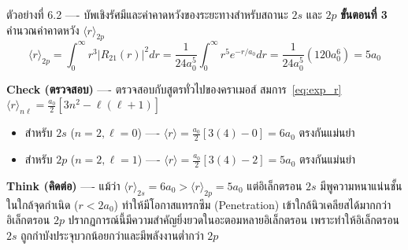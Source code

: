 \begin{psctbox}{ตัวอย่างที่ 6.2 ---- บัพเชิงรัศมีและค่าคาดหวังของระยะทางสำหรับสถานะ $2s$ และ $2p$}
\textbf{ขั้นตอนที่ 3} คำนวณค่าคาดหวัง $\langle r \rangle_{2p}$
\begin{equation*}
\langle r \rangle_{2p} = \int_0^\infty r^3 |R_{21}(r)|^2 dr = \frac{1}{24 a_0^5} \int_0^\infty r^5 e^{-r/a_0} dr = \frac{1}{24 a_0^5} (120 a_0^6) = 5 a_0
\end{equation*}

\textbf{Check (ตรวจสอบ)} ---- ตรวจสอบกับสูตรทั่วไปของคราเมอส์ สมการ~\eqref{eq:exp_r} $\langle r \rangle_{n\ell} = \frac{a_0}{2}[3n^2 - \ell(\ell+1)]$
\begin{itemize}
    \item สำหรับ $2s$ ($n=2, \ell=0$) ---- $\langle r \rangle = \frac{a_0}{2}[3(4) - 0] = 6 a_0$ ตรงกันแม่นยำ
    \item สำหรับ $2p$ ($n=2, \ell=1$) ---- $\langle r \rangle = \frac{a_0}{2}[3(4) - 2] = 5 a_0$ ตรงกันแม่นยำ
\end{itemize}

\textbf{Think (คิดต่อ)} ---- แม้ว่า $\langle r \rangle_{2s} = 6 a_0 > \langle r \rangle_{2p} = 5 a_0$ แต่อิเล็กตรอน $2s$ มีพูความหนาแน่นชั้นในใกล้จุดกำเนิด ($r < 2a_0$) ทำให้มีโอกาสแทรกซึม (Penetration) เข้าใกล้นิวเคลียสได้มากกว่าอิเล็กตรอน $2p$ ปรากฏการณ์นี้มีความสำคัญยิ่งยวดในอะตอมหลายอิเล็กตรอน เพราะทำให้อิเล็กตรอน $2s$ ถูกกำบังประจุบวกน้อยกว่าและมีพลังงานต่ำกว่า $2p$
\end{psctbox}

